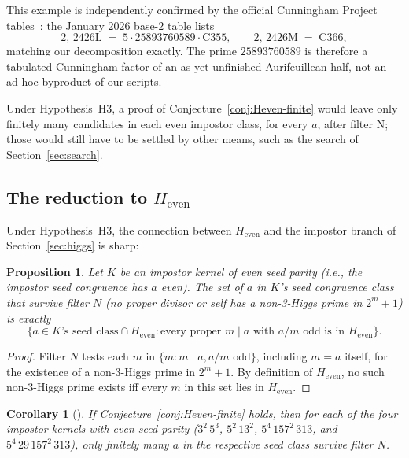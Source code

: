 \documentclass[11pt]{amsart}
\theoremstyle{plain}
\newtheorem{corollary}[theorem]{Corollary}
\newtheorem{proposition}[theorem]{Proposition}
\theoremstyle{definition}
\begin{document}
This example is independently confirmed by the official Cunningham
Project tables~\cite{Wagstaff2002}: the January 2026 base-$2$ table
lists
\[
2,\,2426\mathrm{L} \;=\; 5 \cdot 25893760589 \cdot \mathrm{C}355,
\qquad
2,\,2426\mathrm{M} \;=\; \mathrm{C}366,
\]
matching our decomposition exactly. The prime $25893760589$ is
therefore a tabulated Cunningham factor of an as-yet-unfinished
Aurifeuillean half, not an ad-hoc byproduct of our scripts.

\medskip
Under Hypothesis~H3, a proof of Conjecture~\ref{conj:Heven-finite}
would leave only finitely many
candidates in each even impostor class, for every $a$, after filter N; those
would still have to be settled by other means, such as the search of
Section~\ref{sec:search}.

\subsection{The reduction to \texorpdfstring{$H_{\mathrm{even}}$}{H even}}

Under Hypothesis~H3, the connection between $H_{\mathrm{even}}$ and the
impostor branch of Section~\ref{sec:higgs} is sharp:

\begin{proposition}\label{prop:Heven-reduction}
Let $K$ be an impostor kernel of even seed parity (i.e., the impostor
seed congruence has $a$ even). The set of $a$ in $K$'s seed congruence
class that survive filter $N$ (no proper divisor or self has a
non-3-Higgs prime in $2^m + 1$) is exactly
\[
\{a \in K\text{'s seed class} \cap H_{\mathrm{even}} :
   \text{every proper } m \mid a \text{ with } a/m \text{ odd is in } H_{\mathrm{even}}\}.
\]
\end{proposition}

\begin{proof}
Filter $N$ tests each $m$ in $\{m : m \mid a, a/m \text{ odd}\}$,
including $m = a$ itself, for the existence of a non-3-Higgs prime in
$2^m + 1$. By definition of $H_{\mathrm{even}}$, no such non-3-Higgs
prime exists iff every $m$ in this set lies in $H_{\mathrm{even}}$.
\end{proof}

\begin{corollary}[]\label{cor:finite-cascade}
If Conjecture~\ref{conj:Heven-finite} holds, then for each of the four
impostor kernels with even seed parity ($3^2\,5^3$, $5^2\,13^2$,
$5^4\,157^2\,313$, and $5^4\,29\,157^2\,313$), only finitely many
$a$ in the respective seed class survive filter $N$.
\end{corollary}
\end{document}

